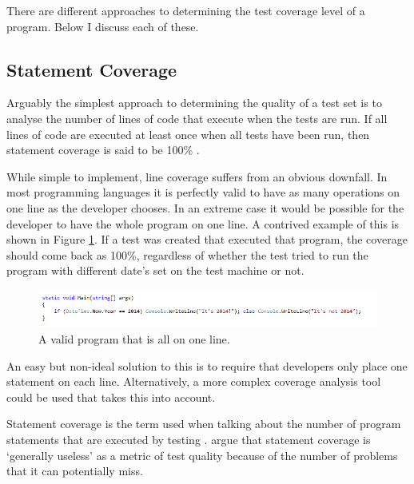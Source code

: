 There are different approaches to determining the test coverage level of a program. Below I discuss each of these.

\subsection{Statement Coverage}


Arguably the simplest approach to determining the quality of a test set is to analyse the number of lines of code that execute when the tests are run. If all lines of code are executed at least once when all tests have been run, then statement coverage is said to be 100\% \citep{something}.

While simple to implement, line coverage suffers from an obvious downfall. In most programming languages it is perfectly valid to have as many operations on one line as the developer chooses. In an extreme case it would be possible for the developer to have the whole program on one line. A contrived example of this is shown in Figure \ref{lineCoverage}. If a test was created that executed that program, the coverage should come back as 100\%, regardless of whether the test tried to run the program with different date's set on the test machine or not.

\begin{figure}
	\begin{center}
		\includegraphics[width=6in]{figures/line_coverage.png}
	\end{center}
\caption{A valid program that is all on one line.}
\label{lineCoverage}
\end{figure}

An easy but non-ideal solution to this is to require that developers only place one statement on each line. Alternatively, a more complex coverage analysis tool could be used that takes this into account.

Statement coverage is the term used when talking about the number of program statements that are executed by testing \citep{Myers:2004:AST:983238}. \citet{Myers:2004:AST:983238} argue that statement coverage is `generally useless' as a metric of test quality because of the number of problems that it can potentially miss.


